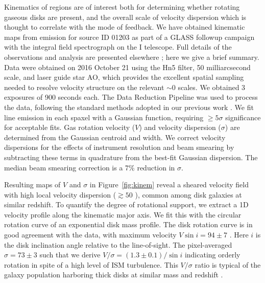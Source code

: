 Kinematics of \HII regions are of interest both for determining whether rotating gaseous disks are present, and the overall scale 
of velocity dispersion which is thought to correlate with the mode of feedback.  We have obtained kinematic maps from \Ha emission 
for source ID 01203 as part of a GLASS followup campaign with the \osiris integral field spectrograph 
\citep{Larkin:2006jd} on the \keck I telescope. Full details of the observations and analysis are presented 
elsewhere \citep{Hirtenstein:2018tn}; here we give a brief summary.  Data were obtained on 2016 October 21 using 
the Hn5 filter, 50 milliarcsecond scale, and laser guide star AO, which provides the excellent spatial sampling 
needed to resolve velocity structure on the relevant $\sim$0 scales. We obtained 3 exposures of 900 
seconds each.  The \osiris Data Reduction Pipeline was used to process the data, following the standard methods 
adopted in our previous work \citep{2013ApJ...765...48J}. We fit \Ha line emission in each spaxel with a Gaussian 
function, requiring $\geq5\sigma$ significance for acceptable fits. Gas rotation velocity ($V$) and velocity 
dispersion ($\sigma$) are determined from the Gaussian centroid and width. We correct velocity dispersions for 
the effects of instrument resolution and beam smearing by subtracting these terms in quadrature from the best-fit 
Gaussian dispersion. The median beam smearing correction is a 7\% reduction in $\sigma$. 

Resulting maps of $V$ and $\sigma$ in Figure~\ref{fig:kinem} reveal a sheared velocity field with high local velocity dispersion
($\gtrsim50$ \kms), common among disk galaxies at similar redshift. To quantify the degree of rotational support, we extract a 1D
velocity profile along the kinematic major axis. We fit this with the circular rotation curve of an exponential
disk mass profile. The disk rotation curve is in good agreement with the data, with maximum velocity $V\sin i = 94\pm7$ \kms.
Here $i$ is the disk inclination angle relative to the line-of-sight. The pixel-averaged $\sigma = 73\pm3$ \kms 
such that we derive $V/\sigma = (1.3\pm0.1) / \sin i$ indicating orderly rotation in spite of a high level of ISM 
turbulence.
This $V/\sigma$ ratio is typical of the galaxy population harboring thick disks
at similar mass and redshift \citep{2015ApJ...799..209W,2015arXiv150901279L}.

